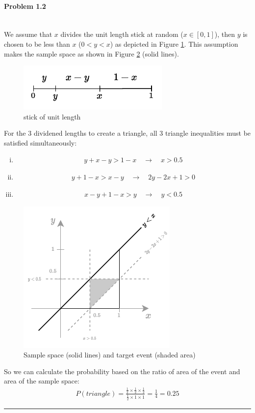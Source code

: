 \documentclass[12pt, letterpaper]{scrartcl}
\begin{document}
\paragraph*{Problem 1.2} \hfill\\
We assume that $x$ divides the unit length stick at random ($x\in[0,1]$), then $y$ is chosen to be less than $x$ ($0<y<x$) as depicted in Figure \ref{fig:stick}. This assumption makes the sample space as shown in Figure \ref{fig:space} (solid lines). 
\begin{figure}[H]
    \includegraphics[width=0.3\linewidth]{hw1_figures/p1.2a.pdf}
    \centering
    \caption{stick of unit length}
    \label{fig:stick}
\end{figure}
For the 3 dividened lengths to create a triangle, all 3 triangle inequalities must be satisfied simultaneously:
    \begin{enumerate}[i.]
        \item
        \begin{align*}
            y+x-y>1-x \quad \longrightarrow \quad x>0.5
        \end{align*}
        \item
        \begin{align*}
            y+1-x>x-y \quad \longrightarrow \quad 2y-2x+1>0
        \end{align*}
        \item
        \begin{align*}
            x-y+1-x>y \quad \longrightarrow \quad y<0.5
        \end{align*}
    \end{enumerate}
\begin{figure}[H]
    \includegraphics[width=0.5\linewidth]{hw1_figures/p1.2.pdf}
    \centering
    \caption{Sample space (solid lines) and target event (shaded area)}
    \label{fig:space}
\end{figure}
So we can calculate the probability based on the ratio of area of the event and area of the sample space:
\begin{align*}
    P(triangle)=\frac{\frac{1}{2}\times\frac{1}{2}\times\frac{1}{2}}{\frac{1}{2}\times1\times1}=\frac{1}{4}=0.25
\end{align*}
\hrule
\end{document}
